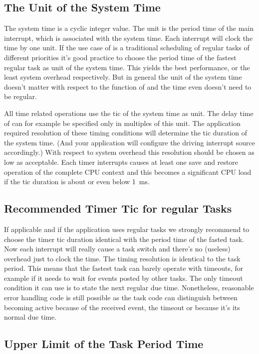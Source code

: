 \subsection{The Unit of the System Time}

The system time is a cyclic integer value. The unit is the period time of
the main interrupt, which is associated with the system time. Each
interrupt will clock the time by one unit. If the use case of \rtos{} is a
traditional scheduling of regular tasks of different priorities it's good
practice to choose the period time of the fastest regular task as unit of
the system time. This yields the best performance, or the least system
overhead respectively. But in general the unit of the system time doesn't
matter with respect to the function of \rtos{} and the time even doesn't
need to be regular.

All time related operations use the tic of the system time as unit. The
delay time of  can for example be specified only in
multiples of this unit. The application required resolution of these
timing conditions will determine the tic duration of the system time. (And
your application will configure the driving interrupt source accordingly.)
With respect to system overhead this resolution should be chosen as low as
acceptable. Each timer interrupts causes at least one save and restore
operation of the complete CPU context and this becomes a significant CPU
load if the tic duration is about or even below 1~ms.


\subsection{Recommended Timer Tic for regular Tasks}

If applicable and if the application uses regular tasks we strongly
recommend to choose the timer tic duration identical with the period time
of the fasted task. Now each interrupt will really cause a task switch and
there's no (useless) overhead just to clock the time. The timing
resolution is identical to the task period. This means that the fastest
task can barely operate with timeouts, for example if it needs to wait for
events posted by other tasks. The only timeout condition it can use is to
state the next regular due time. Nonetheless, reasonable error handling
code is still possible as the task code can distinguish between becoming
active because of the received event, the timeout or because it's its
normal due time.


\subsection{Upper Limit of the Task Period Time}

